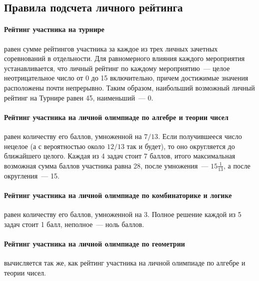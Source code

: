 \subsection*{Правила подсчета личного рейтинга}


\paragraph{Рейтинг участника на турнире}
равен сумме рейтингов участника за каждое из трех личных зачетных соревнований
в отдельности.
Для равномерного влияния каждого мероприятия устанавливается, что личный
рейтинг по каждому мероприятию~--- целое неотрицательное число от 0 до 15
включительно, причем достижимые значения расположены почти непрерывно.
Таким образом, наибольший возможный личный рейтинг на Турнире равен 45,
наименьший~--- 0.

\paragraph{Рейтинг участника на личной олимпиаде по алгебре и теории чисел}
равен количеству его баллов, умноженной на $7/13$.
Если получившееся число нецелое (а с вероятностью около $12/13$ так и будет), то оно
округляется до ближайшего целого.
Каждая из 4 задач стоит 7 баллов, итого максимальная возможная сумма баллов
участника равна 28, после умножения~--- $15\frac{1}{13}$, а после
округления~--- 15.

\paragraph{Рейтинг участника на личной олимпиаде по комбинаторике и логике}
равен количеству его баллов, умноженной на 3.
Полное решение каждой из 5 задач стоит 1 балл, неполное~--- ноль баллов.

\paragraph{Рейтинг участника на личной олимпиаде по геометрии}
вычисляется так же, как рейтинг участника на
личной олимпиаде по алгебре и теории чисел.

